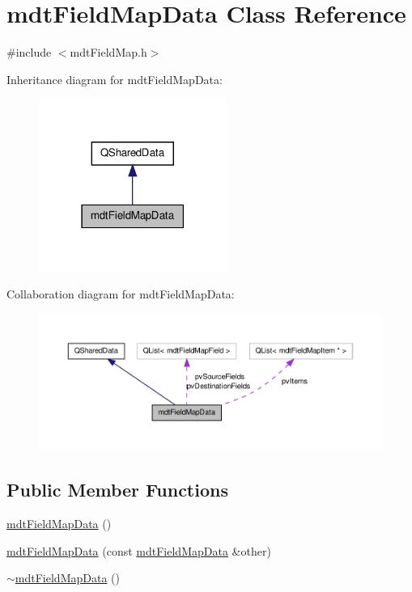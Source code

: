 \hypertarget{classmdt_field_map_data}{\section{mdt\-Field\-Map\-Data Class Reference}
\label{classmdt_field_map_data}
}


{\ttfamily \#include $<$mdt\-Field\-Map.\-h$>$}



Inheritance diagram for mdt\-Field\-Map\-Data\-:\nopagebreak
\begin{figure}[H]
\begin{center}
\leavevmode
\includegraphics[width=174pt]{classmdt_field_map_data__inherit__graph}
\end{center}
\end{figure}


Collaboration diagram for mdt\-Field\-Map\-Data\-:\nopagebreak
\begin{figure}[H]
\begin{center}
\leavevmode
\includegraphics[width=350pt]{classmdt_field_map_data__coll__graph}
\end{center}
\end{figure}
\subsection*{Public Member Functions}
\begin{DoxyCompactItemize}
\item 
\hyperlink{classmdt_field_map_data_a415a1944bb29d3924bc2c6cdfc16d6e9}{mdt\-Field\-Map\-Data} ()
\item 
\hyperlink{classmdt_field_map_data_a6d0ffeb8ea676ef83975e9d5ebb1fed1}{mdt\-Field\-Map\-Data} (const \hyperlink{classmdt_field_map_data}{mdt\-Field\-Map\-Data} \&other)
\item 
\hyperlink{classmdt_field_map_data_a59e52f8613a8cdb5d6c1baa0d74109a7}{$\sim$mdt\-Field\-Map\-Data} ()
\end{DoxyCompactItemize}
